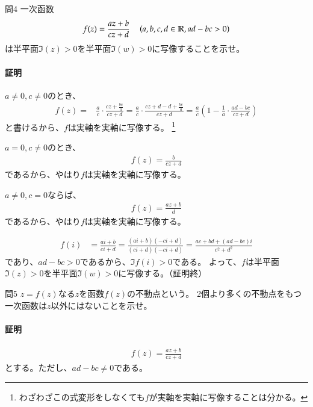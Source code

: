 \newpage
\begin{mysimplebox}{問4}
    一次函数
    \begin{align*}
        f(z)=\frac{az+b}{cz+d}
        \quad\left(a,b,c,d\in\mathbb{R},ad-bc>0\right)
    \end{align*}
    は半平面$\Im(z)>0$を半平面$\Im(w)>0$に写像することを示せ。
\end{mysimplebox}
\paragraph{証明}
$a\neq0,c\neq0$のとき、
\begin{align*}
    f(z)=&\frac{a}{c}\cdot\frac{cz+\frac{bc}{a}}{cz+d}
    =\frac{a}{c}\cdot\frac{cz+d-d+\frac{bc}{a}}{cz+d}
    =\frac{a}{c}\left(1-\frac{1}{a}\cdot\frac{ad-bc}{cz+d}\right)
\end{align*}
と書けるから、$f$は実軸を実軸に写像する。
\footnote{わざわざこの式変形をしなくても$f$が実軸を実軸に写像することは分かる。}

$a=0,c\neq0$のとき、
\begin{align*}
    f(z)=\frac{b}{cz+d}
\end{align*}
であるから、やはり$f$は実軸を実軸に写像する。

$a\neq0,c=0$ならば、
\begin{align*}
    f(z)=\frac{az+b}{d}
\end{align*}
であるから、やはり$f$は実軸を実軸に写像する。

\begin{align*}
    f(i)&=\frac{ai+b}{ci+d}
    =\frac{(ai+b)(-ci+d)}{(ci+d)(-ci+d)}
    =\frac{ac+bd+(ad-bc)i}{c^2+d^2}
\end{align*}
であり、$ad-bc>0$であるから、$\Im f(i)>0$である。
よって、$f$は半平面$\Im(z)>0$を半平面$\Im(w)>0$に写像する。（証明終）

\newpage
\begin{mysimplebox}{問5}
    $z=f(z)$なる$z$を函数$f(z)$の不動点という。
    2個より多くの不動点をもつ一次函数は$z$以外にはないことを示せ。
\end{mysimplebox}
\paragraph{証明}
\begin{align*}
    f(z)=\frac{az+b}{cz+d}
\end{align*}
とする。ただし、$ad-bc\neq0$である。

